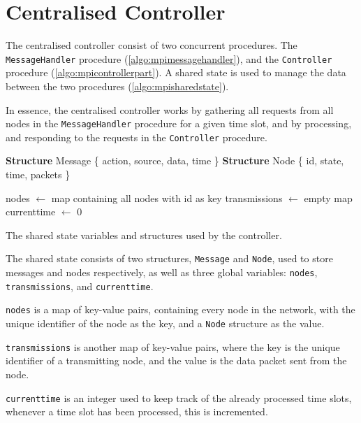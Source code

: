 \section{Centralised Controller}\label{sec:mpicontroller}
The centralised controller consist of two concurrent procedures. The \texttt{MessageHandler} procedure (\autoref{algo:mpimessagehandler}), and the \texttt{Controller} procedure (\autoref{algo:mpicontrollerpart}). A shared state is used to manage the data between the two procedures (\autoref{algo:mpisharedstate}). \medbreak
{}

In essence, the centralised controller works by gathering all requests from all nodes in the \texttt{MessageHandler} procedure for a given time slot, and by processing, and responding to the requests in the \texttt{Controller} procedure.

\begin{algorithm}[ht]
    \DontPrintSemicolon
    
    \textbf{Structure} Message \{ action, source, data, time \}\;
    \textbf{Structure} Node \{ id, state, time, packets \}\; %
    \;
    
    
    nodes $\leftarrow$ map containing all nodes with id as key\;
    transmissions $\leftarrow$ empty map\;
    currenttime $\leftarrow$ 0\;
 
    \caption{The shared state variables and structures used by the controller.}
    \label{algo:mpisharedstate}
\end{algorithm}

The shared state consists of two structures, \texttt{Message} and \texttt{Node}, used to store messages and nodes respectively, as well as three global variables: \texttt{nodes}, \texttt{transmissions}, and \texttt{currenttime}. \smallbreak

\texttt{nodes} is a map of key-value pairs, containing every node in the network, with the unique identifier of the node as the key, and a \texttt{Node} structure as the value. \smallbreak

\texttt{transmissions} is another map of key-value pairs, where the key is the unique identifier of a transmitting node, and the value is the data packet sent from the node. \smallbreak

\texttt{currenttime} is an integer used to keep track of the already processed time slots, whenever a time slot has been processed, this is incremented.

